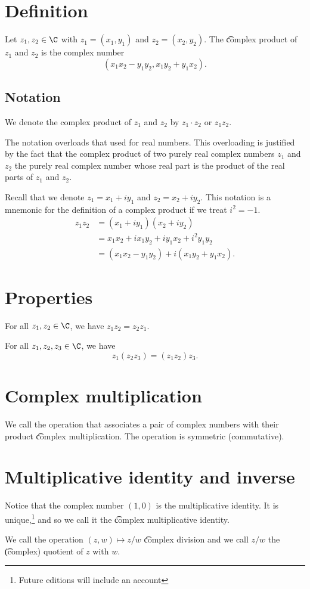 
\section*{Definition}

Let $z_1, z_2 \in \C $ with $z_1 = (x_1, y_1)$ and $z_2 = (x_2, y_2)$.
The \t{complex product} of $z_1$ and $z_2$ is the complex number
\[
(x_1x_2 - y_1y_2, x_1y_2 + y_1x_2).
\]

\subsection*{Notation}

We denote the complex product of $z_1$ and $z_2$ by $z_1 \cdot  z_2$ or $z_1z_2$.

The notation overloads that used for real numbers.
This overloading is justified by the fact that the complex product of two purely real complex numbers $z_1$ and $z_2$ the purely real complex number whose real part is the product of the real parts of $z_1$ and $z_2$.

Recall that we denote $z_1 = x_1 + iy_1$ and $z_2 = x_2 + iy_2$.
This notation is a mnemonic for the definition of a complex product if we treat $i^2 = -1$.
\[
\begin{aligned}
z_1z_2 &= (x_1 + iy_1)(x_2 + iy_2) \\
&= x_1x_2 + ix_1y_2 + iy_1x_2 + i^2 y_1y_2 \\
&= (x_1x_2 - y_1y_2) + i(x_1y_2 + y_1x_2).
\end{aligned}
\]

\section*{Properties}

\begin{proposition}[Commutativity]
For all $z_1, z_2 \in \C $, we have $z_1z_2 = z_2z_1$.
\end{proposition}

\begin{proposition}[Associativity]
For all $z_1, z_2, z_3 \in \C $, we have
\[
z_1(z_2z_3) = (z_1z_2)z_3.
\]
\end{proposition}

\section*{Complex multiplication}

We call the operation that associates a pair of complex numbers with their product \t{complex multiplication}.
The operation is symmetric (commutative).

\section*{Multiplicative identity and inverse}

Notice that the complex number $(1, 0)$ is the multiplicative identity.
It is unique,\footnote{Future editions will include an account}
and so we call it the \t{complex multiplicative identity.}

We call the operation $(z, w) \mapsto z/w$ \t{complex division} and we call $z/w$ the \t{(complex) quotient} of $z$ with $w$.
